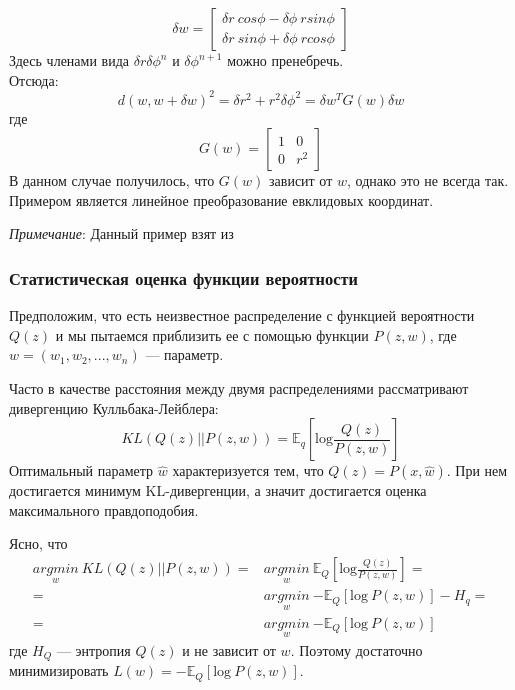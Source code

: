 \documentclass[a4paper,12pt]{article}
\begin{document}
$$
\delta w = 
\left[ 
    \begin{aligned} 
        \delta r ~ cos \phi - \delta \phi ~ r sin \phi \\
        \delta r ~ sin \phi + \delta \phi ~ r cos \phi
    \end{aligned}
\right]
$$
Здесь членами вида $\delta r \delta \phi^n$ и $\delta \phi^{n+1}$ можно пренебречь. \\
Отсюда: 
$$d(w, w + \delta w)^2 = \delta r^2 + r^2 \delta \phi^2 = \delta w^TG(w)\delta w$$
где
$$
G(w) = 
\begin{bmatrix}
    1 & 0 \\
    0 & r^2
\end{bmatrix}
$$ \label{PolarTensor}
В данном случае получилось, что $G(w)$ зависит от $w$, однако это не всегда так. Примером является линейное преобразование евклидовых координат.

\emph{Примечание}:
    Данный пример взят из \cite{AmariWhy}

\newpage

\subsubsection{Статистическая оценка функции вероятности}

Предположим, что есть неизвестное распределение с функцией вероятности $Q(z)$ и мы пытаемся приблизить ее с помощью
функции $P(z, w)$, где $w = (w_1, w_2, ..., w_n)$ --- параметр.

Часто в качестве расстояния между двумя распределениями рассматривают дивергенцию Кулльбака-Лейблера:
$$KL(Q(z) || P(z, w)) = \mathbb{E}_q\left[\mbox{log} \frac{Q(z)}{P(z, w)}\right] $$
Оптимальный параметр $\hat{w}$ характеризуется тем, что $Q(z) = P(x, \hat{w})$. При нем достигается минимум KL-дивергенции, а значит достигается оценка максимального правдоподобия.

Ясно, что
$$ 
\begin{aligned}
    \underset{w}{argmin} ~ KL(Q(z) || P(z, w)) 
    = & \underset{w}{argmin} ~ \mathbb{E}_Q\left[\mbox{log} \frac{Q(z)}{P(z, w)}\right] = \\
    = & \underset{w}{argmin} ~ \mathbb{-E}_Q\left[\mbox{log} ~ P(z, w)\right] - H_q = \\
    = & \underset{w}{argmin} ~ \mathbb{-E}_Q\left[\mbox{log} ~ P(z, w)\right]
\end{aligned}
$$ где $H_Q$ --- энтропия $Q(z)$ и не зависит от $w$. Поэтому достаточно минимизировать $L(w) = \mathbb{-E}_Q\left[\mbox{log} ~ P(z, w)\right]$.
\end{document}
